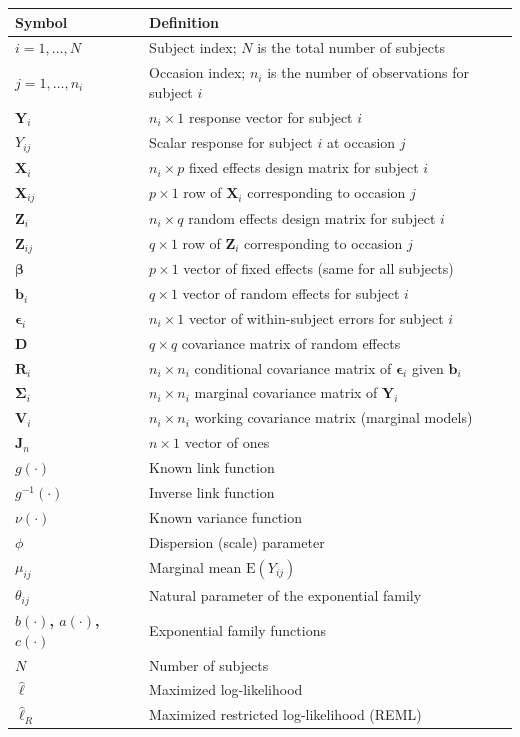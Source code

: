 \documentclass[11pt]{article}
\newcommand{\bY}{\mathbf{Y}}
\newcommand{\bX}{\mathbf{X}}
\newcommand{\bZ}{\mathbf{Z}}
\newcommand{\bbeta}{\boldsymbol{\beta}}
\newcommand{\bepsilon}{\boldsymbol{\epsilon}}
\newcommand{\bSigma}{\boldsymbol{\Sigma}}
\newcommand{\E}{\mathrm{E}}
\begin{document}
\begin{center}
\renewcommand{\arraystretch}{1.4}
\begin{tabular}{>{\bfseries}p{3cm} p{10cm}}
\toprule
Symbol & Definition \\
\midrule
$i = 1, \ldots, N$ & Subject index; $N$ is the total number of subjects \\
$j = 1, \ldots, n_i$ & Occasion index; $n_i$ is the number of observations for subject $i$ \\
$\bY_i$ & $n_i \times 1$ response vector for subject $i$ \\
$Y_{ij}$ & Scalar response for subject $i$ at occasion $j$ \\
$\bX_i$ & $n_i \times p$ fixed effects design matrix for subject $i$ \\
$\mathbf{X}_{ij}$ & $p \times 1$ row of $\bX_i$ corresponding to occasion $j$ \\
$\bZ_i$ & $n_i \times q$ random effects design matrix for subject $i$ \\
$\mathbf{Z}_{ij}$ & $q \times 1$ row of $\bZ_i$ corresponding to occasion $j$ \\
$\bbeta$ & $p \times 1$ vector of fixed effects (same for all subjects) \\
$\mathbf{b}_i$ & $q \times 1$ vector of random effects for subject $i$ \\
$\bepsilon_i$ & $n_i \times 1$ vector of within-subject errors for subject $i$ \\
$\mathbf{D}$ & $q \times q$ covariance matrix of random effects \\
$\mathbf{R}_i$ & $n_i \times n_i$ conditional covariance matrix of $\bepsilon_i$ given $\mathbf{b}_i$ \\
$\bSigma_i$ & $n_i \times n_i$ marginal covariance matrix of $\bY_i$ \\
$\mathbf{V}_i$ & $n_i \times n_i$ working covariance matrix (marginal models) \\
$\mathbf{J}_n$ & $n \times 1$ vector of ones \\
$g(\cdot)$ & Known link function \\
$g^{-1}(\cdot)$ & Inverse link function \\
$\nu(\cdot)$ & Known variance function \\
$\phi$ & Dispersion (scale) parameter \\
$\mu_{ij}$ & Marginal mean $\E(Y_{ij})$ \\
$\theta_{ij}$ & Natural parameter of the exponential family \\
$b(\cdot)$, $a(\cdot)$, $c(\cdot)$ & Exponential family functions \\
$N$ & Number of subjects \\
$\hat{\ell}$ & Maximized log-likelihood \\
$\hat{\ell}_R$ & Maximized restricted log-likelihood (REML) \\
\bottomrule
\end{tabular}
\end{center}
\end{document}
